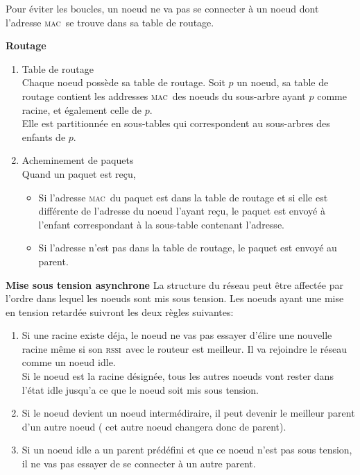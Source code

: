 \documentclass[a4paper, 12pt]{report}
\newcommand{\espmesh}{\textsc{esp-mesh}}
\newcommand{\mac}{\textsc{mac}}
\newcommand{\rssi}{\textsc{rssi}}
\begin{document}
        Pour éviter les boucles, un noeud ne va pas se connecter à un noeud dont l'adresse \mac\ se trouve dans sa table de routage.
        \vspace{0.5cm}

        \textbf{Routage}\newline
            \begin{enumerate}
                \item Table de routage\\
                    Chaque noeud possède sa table de routage. Soit $p$ un noeud, sa table de routage contient les addresses \mac\ 
                    des noeuds du sous-arbre ayant $p$ comme racine, et également celle de $p$.\\
                    Elle est partitionnée en sous-tables qui correspondent au sous-arbres des enfants de $p$.
                \item Acheminement de paquets\\
                    Quand un paquet est reçu,
                    \begin{itemize}
                        \item Si l'adresse \mac\ du paquet est dans la table de routage et si elle est différente de l'adresse du noeud l'ayant reçu, le paquet est envoyé
                        à l'enfant correspondant à la sous-table contenant l'adresse.
                        \item Si l'adresse n'est pas dans la table de routage, le paquet est envoyé au parent.
                    \end{itemize}

            \end{enumerate}
            \vspace{0.5cm}
        \textbf{Mise sous tension asynchrone}\newline
            La structure du réseau peut être affectée par l'ordre dans lequel les noeuds sont mis sous tension.
            Les noeuds ayant une mise en tension retardée suivront les deux règles suivantes:
            \begin{enumerate}
                \item Si une racine existe déja, le noeud ne vas pas essayer d'élire une nouvelle racine
                    même si son \rssi\ avec le routeur est meilleur. Il va rejoindre le réseau comme un noeud idle. \\
                    Si le noeud est la racine désignée, tous les autres noeuds vont rester dans l'état idle
                    jusqu'a ce que le noeud soit mis sous tension.
                \item Si le noeud devient un noeud intermédiraire, il peut devenir le meilleur parent d'un autre noeud ( cet autre noeud changera donc de parent).
                \item Si un noeud idle a un parent prédéfini et que ce noeud n'est pas sous tension, il ne vas pas essayer de se connecter à un autre parent.
            \end{enumerate}
\end{document}

